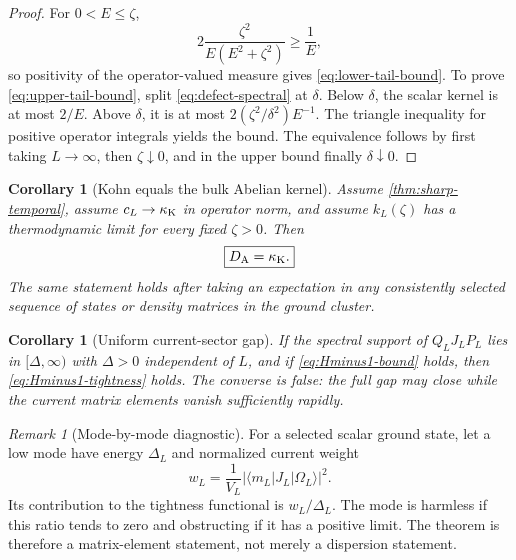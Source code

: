 \documentclass[11pt]{article}
\newtheorem{corollary}[theorem]{Corollary}
\theoremstyle{definition}
\theoremstyle{remark}
\newtheorem{remark}[theorem]{Remark}
\newcommand{\ket}[1]{\lvert #1\rangle}
\newcommand{\bra}[1]{\langle #1\rvert}
\newcommand{\abs}[1]{\lvert #1\rvert}
\begin{document}
\begin{proof}
For $0<E\le\zeta$,
\begin{equation}
 2\frac{\zeta^2}{E(E^2+\zeta^2)}\ge\frac1E,
\end{equation}
so positivity of the operator-valued measure gives \eqref{eq:lower-tail-bound}.  To prove
\eqref{eq:upper-tail-bound}, split \eqref{eq:defect-spectral} at $\delta$.  Below $\delta$, the scalar
kernel is at most $2/E$.  Above $\delta$, it is at most
$2(\zeta^2/\delta^2)E^{-1}$.  The triangle inequality for positive operator integrals yields the bound.
The equivalence follows by first taking $L\to\infty$, then $\zeta\downarrow0$, and in the upper bound
finally $\delta\downarrow0$.
\end{proof}

\begin{corollary}[Kohn equals the bulk Abelian kernel]
\label{cor:Kohn-Drude}
Assume \cref{thm:sharp-temporal}, assume $c_L\to\kappa_{\rm K}$ in operator norm, and assume
$k_L(\zeta)$ has a thermodynamic limit for every fixed $\zeta>0$.  Then
\begin{equation}
 \boxed{D_{\rm A}=\kappa_{\rm K}.}
\end{equation}
The same statement holds after taking an expectation in any consistently selected sequence of states or
density matrices in the ground cluster.
\end{corollary}

\begin{corollary}[Uniform current-sector gap]
\label{cor:current-gap}
If the spectral support of $Q_LJ_LP_L$ lies in $[\Delta,\infty)$ with $\Delta>0$ independent of $L$,
and if \eqref{eq:Hminus1-bound} holds, then \eqref{eq:Hminus1-tightness} holds.  The converse is false:
the full gap may close while the current matrix elements vanish sufficiently rapidly.
\end{corollary}

\begin{remark}[Mode-by-mode diagnostic]
For a selected scalar ground state, let a low mode have energy $\Delta_L$ and normalized current weight
\begin{equation}
 w_L=\frac1{V_L}\abs{\bra{m_L}J_L\ket{\Omega_L}}^2.
\end{equation}
Its contribution to the tightness functional is $w_L/\Delta_L$.  The mode is harmless if this ratio tends
to zero and obstructing if it has a positive limit.  The theorem is therefore a matrix-element statement,
not merely a dispersion statement.
\end{remark}
\end{document}
